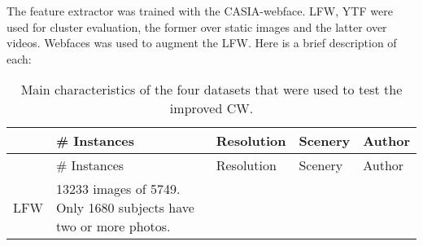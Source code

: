 \documentclass[]{article}
\begin{document}
The feature extractor was trained with the CASIA-webface. LFW, YTF were used for cluster evaluation, the former over static images and the latter over videos. Webfaces was used to augment the LFW. Here is a brief description of each:

\small

\begin{longtable}[]{@{}lllll@{}}
\caption{\label{tab:table1} Main characteristics of the four datasets that were used to test the improved CW.}\tabularnewline
\toprule
\begin{minipage}[b]{0.09\columnwidth}\raggedright
\strut
\end{minipage} & \begin{minipage}[b]{0.24\columnwidth}\raggedright
\# Instances\strut
\end{minipage} & \begin{minipage}[b]{0.14\columnwidth}\raggedright
Resolution\strut
\end{minipage} & \begin{minipage}[b]{0.19\columnwidth}\raggedright
Scenery\strut
\end{minipage} & \begin{minipage}[b]{0.20\columnwidth}\raggedright
Author\strut
\end{minipage}\tabularnewline
\midrule
\endfirsthead
\toprule
\begin{minipage}[b]{0.09\columnwidth}\raggedright
\strut
\end{minipage} & \begin{minipage}[b]{0.24\columnwidth}\raggedright
\# Instances\strut
\end{minipage} & \begin{minipage}[b]{0.14\columnwidth}\raggedright
Resolution\strut
\end{minipage} & \begin{minipage}[b]{0.19\columnwidth}\raggedright
Scenery\strut
\end{minipage} & \begin{minipage}[b]{0.20\columnwidth}\raggedright
Author\strut
\end{minipage}\tabularnewline
\midrule
\endhead
\begin{minipage}[t]{0.09\columnwidth}\raggedright
LFW\strut
\end{minipage} & \begin{minipage}[t]{0.24\columnwidth}\raggedright
13233 images of 5749. Only 1680 subjects have two or more photos.\strut
\end{minipage} & \begin{minipage}[t]{0.14\columnwidth}\raggedright

\end{minipage}
\end{longtable}
\end{document}
